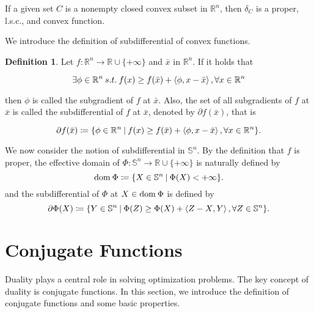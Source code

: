 \documentclass[a4paper,11pt, oneside]{book}
\theoremstyle{definition}
\newtheorem{dfn}[thm]{Definition}
\newcommand{\RealNumberSet}{\mathbb{R}}
\newcommand{\NDemenstionalRealEuclideanSpace}{\mathbb{R}^n}
\newcommand{\NDemenstionalRealSymmetricMatrixSpace}{\mathbb{S}^n}
\newcommand{\Domain}[1]{\text{\rm dom\:${#1}$}} %
\newcommand{\InnerProduct}[2]{\left\langle {#1},{#2}\right\rangle} %
\newcommand{\ExtendedRealValuedFunction}[2]{{#1}: {#2} \to \RealNumberSet \cup \{+\infty\}}
\newcommand{\IndicatorFunction}[1]{\delta_{#1}}
\newcommand{\SetForm}[2]{
  \{{#1}\:|\:{#2}\}
}
\begin{document}
If a given set $C$ is a nonempty closed convex subset in $\NDemenstionalRealEuclideanSpace$, then $\IndicatorFunction{C}$ is a proper, l.s.c., and convex function.

We introduce the definition of subdifferential of convex functions.

\begin{dfn}
  Let $\ExtendedRealValuedFunction{f}{\NDemenstionalRealEuclideanSpace}$ and $\bar{x}$ in $\NDemenstionalRealEuclideanSpace$. If it holds that

  \begin{equation}
    \exists \phi \in \NDemenstionalRealEuclideanSpace \:s.t.\: f(x) \geq f(\bar{x}) + \left\langle \phi, x-\bar{x} \right\rangle, \forall x \in \NDemenstionalRealEuclideanSpace \notag
  \end{equation}

  then $\phi$ is called the subgradient of $f$ at $\bar{x}$. Also, the set of all subgradients of $f$ at $\bar{x}$ is called the subdifferential of $f$ at $\bar{x}$, denoted by $\partial f(\bar{x})$, that is

  \begin{equation}
    \partial f(\bar{x}) \coloneqq \SetForm{\phi \in \NDemenstionalRealEuclideanSpace}{f(x) \geq f(\bar{x}) + \InnerProduct{\phi}{x-\bar{x}}, \forall x \in \NDemenstionalRealEuclideanSpace } . \notag
  \end{equation}
\end{dfn}

We now consider the notion of subdifferential in $\NDemenstionalRealSymmetricMatrixSpace$. By the definition that $f$ is proper, the effective domain of $\ExtendedRealValuedFunction{\Phi}{\NDemenstionalRealSymmetricMatrixSpace}$ is naturally defined by
\begin{equation}
  \Domain{\Phi} \coloneqq \SetForm{X \in \NDemenstionalRealSymmetricMatrixSpace}{\Phi(X) < +\infty}. \notag
\end{equation}
and the subdifferential of $\Phi$ at $X \in \Domain{\Phi}$ is defined by
\begin{equation}
  \partial \Phi(X) \coloneqq \SetForm{Y \in \NDemenstionalRealSymmetricMatrixSpace}{\Phi(Z) \geq \Phi(X) + \InnerProduct{Z-X}{Y}, \forall Z \in \NDemenstionalRealSymmetricMatrixSpace}. \notag
\end{equation}

\section{Conjugate Functions}
Duality plays a central role in solving optimization problems. The key concept of duality is conjugate functions. In this section, we introduce the definition of conjugate functions and some basic properties.
\end{document}
